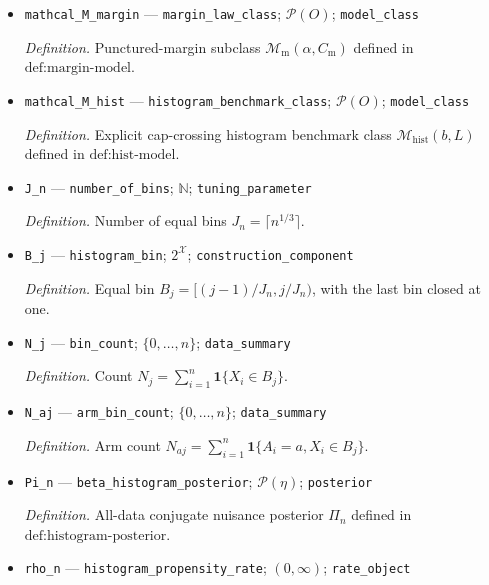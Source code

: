 \documentclass{article}
\begin{document}
\begin{itemize}
  \item \texttt{mathcal\_\allowbreak{}M\_\allowbreak{}margin} --- \texttt{margin\_\allowbreak{}law\_\allowbreak{}class}; \(\mathcal P(O)\); \texttt{model\_\allowbreak{}class}
  \par\smallskip\noindent\emph{Definition.} Punctured-margin subclass \(\mathcal M_{\mathrm m}(\alpha,C_{\mathrm m})\) defined in \(\text{def:margin-model}\).
  \item \texttt{mathcal\_\allowbreak{}M\_\allowbreak{}hist} --- \texttt{histogram\_\allowbreak{}benchmark\_\allowbreak{}class}; \(\mathcal P(O)\); \texttt{model\_\allowbreak{}class}
  \par\smallskip\noindent\emph{Definition.} Explicit cap-crossing histogram benchmark class \(\mathcal M_{\mathrm{hist}}(b,L)\) defined in \(\text{def:hist-model}\).
  \item \texttt{J\_\allowbreak{}n} --- \texttt{number\_\allowbreak{}of\_\allowbreak{}bins}; \(\mathbb N\); \texttt{tuning\_\allowbreak{}parameter}
  \par\smallskip\noindent\emph{Definition.} Number of equal bins \(J_n=\lceil n^{1/3}\rceil\).
  \item \texttt{B\_\allowbreak{}j} --- \texttt{histogram\_\allowbreak{}bin}; \(2^{\mathcal X}\); \texttt{construction\_\allowbreak{}component}
  \par\smallskip\noindent\emph{Definition.} Equal bin \(B_j=[(j-1)/J_n,j/J_n)\), with the last bin closed at one.
  \item \texttt{N\_\allowbreak{}j} --- \texttt{bin\_\allowbreak{}count}; \(\{0,\ldots,n\}\); \texttt{data\_\allowbreak{}summary}
  \par\smallskip\noindent\emph{Definition.} Count \(N_j=\sum_{i=1}^n\mathbf 1\{X_i\in B_j\}\).
  \item \texttt{N\_\allowbreak{}aj} --- \texttt{arm\_\allowbreak{}bin\_\allowbreak{}count}; \(\{0,\ldots,n\}\); \texttt{data\_\allowbreak{}summary}
  \par\smallskip\noindent\emph{Definition.} Arm count \(N_{aj}=\sum_{i=1}^n\mathbf 1\{A_i=a,X_i\in B_j\}\).
  \item \texttt{Pi\_\allowbreak{}n} --- \texttt{beta\_\allowbreak{}histogram\_\allowbreak{}posterior}; \(\mathcal P(\eta)\); \texttt{posterior}
  \par\smallskip\noindent\emph{Definition.} All-data conjugate nuisance posterior \(\Pi_n\) defined in \(\text{def:histogram-posterior}\).
  \item \texttt{rho\_\allowbreak{}n} --- \texttt{histogram\_\allowbreak{}propensity\_\allowbreak{}rate}; \((0,\infty)\); \texttt{rate\_\allowbreak{}object}

\end{itemize}
\end{document}
